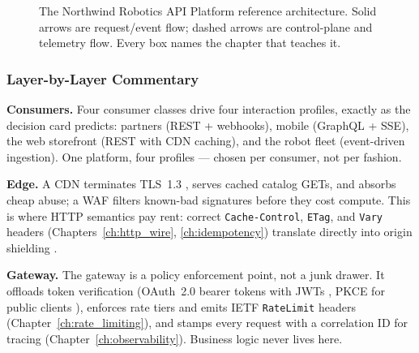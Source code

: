 \begin{figure}[htbp]
\caption{The Northwind Robotics API Platform reference architecture. Solid
arrows are request/event flow; dashed arrows are control-plane and telemetry
flow. Every box names the chapter that teaches it.}
\label{fig:ref-arch}
\end{figure}

\subsubsection{Layer-by-Layer Commentary}

\textbf{Consumers.} Four consumer classes drive four interaction profiles,
exactly as the decision card predicts: partners (REST + webhooks), mobile
(GraphQL + SSE), the web storefront (REST with CDN caching), and the robot
fleet (event-driven ingestion). One platform, four profiles --- chosen per
consumer, not per fashion.

\textbf{Edge.} A CDN terminates TLS~1.3 \cite{rfc8446}, serves cached catalog
GETs, and absorbs cheap abuse; a WAF filters known-bad signatures before they
cost compute. This is where HTTP semantics pay rent: correct
\texttt{Cache-Control}, \texttt{ETag}, and \texttt{Vary} headers
(Chapters~\ref{ch:http_wire}, \ref{ch:idempotency}) translate directly into
origin shielding \cite{rfc9110}.

\textbf{Gateway.} The gateway is a policy enforcement point, not a junk
drawer. It offloads token verification (OAuth~2.0 bearer tokens with JWTs
\cite{rfc6749,rfc7519}, PKCE for public clients \cite{rfc7636}), enforces
rate tiers and emits IETF \texttt{RateLimit} headers
\cite{ietf_ratelimit_headers} (Chapter~\ref{ch:rate_limiting}), and stamps
every request with a correlation ID for tracing
(Chapter~\ref{ch:observability}). Business logic never lives here.

